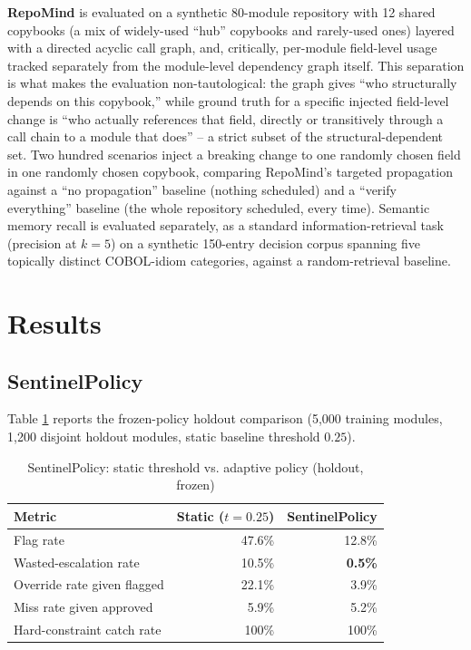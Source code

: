 \documentclass[conference]{IEEEtran}
\begin{document}
\textbf{RepoMind} is evaluated on a synthetic 80-module repository with 12
shared copybooks (a mix of widely-used ``hub'' copybooks and rarely-used
ones) layered with a directed acyclic call graph, and, critically, per-module
field-level usage tracked separately from the module-level dependency graph
itself. This separation is what makes the evaluation non-tautological: the
graph gives ``who structurally depends on this copybook,'' while ground
truth for a specific injected field-level change is ``who actually
references that field, directly or transitively through a call chain to a
module that does'' -- a strict subset of the structural-dependent set.
Two hundred scenarios inject a breaking change to one randomly chosen field
in one randomly chosen copybook, comparing RepoMind's targeted propagation
against a ``no propagation'' baseline (nothing scheduled) and a ``verify
everything'' baseline (the whole repository scheduled, every time).
Semantic memory recall is evaluated separately, as a standard information-retrieval
task (precision at $k=5$) on a synthetic 150-entry decision corpus spanning
five topically distinct COBOL-idiom categories, against a random-retrieval
baseline.

\section{Results}
\label{sec:results}

\subsection{SentinelPolicy}

Table \ref{tab:sentinel} reports the frozen-policy holdout comparison (5{,}000
training modules, 1{,}200 disjoint holdout modules, static baseline threshold
$0.25$).

\begin{table}[t]
\centering
\caption{SentinelPolicy: static threshold vs. adaptive policy (holdout, frozen)}
\label{tab:sentinel}
\begin{tabular}{@{}lrr@{}}
\toprule
Metric & Static ($t{=}0.25$) & SentinelPolicy \\
\midrule
Flag rate & 47.6\% & 12.8\% \\
Wasted-escalation rate & 10.5\% & \textbf{0.5\%} \\
Override rate given flagged & 22.1\% & 3.9\% \\
Miss rate given approved & 5.9\% & 5.2\% \\
Hard-constraint catch rate & 100\% & 100\% \\
\bottomrule
\end{tabular}
\end{table}
\end{document}
